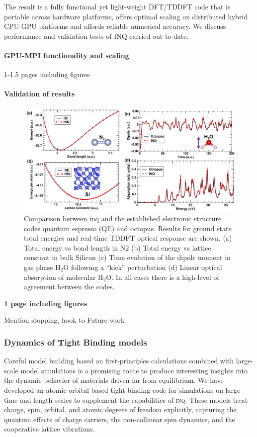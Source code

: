 The result is a fully functional yet light-weight DFT/TDDFT code that is portable across hardware platforms, offers optimal scaling on distributed hybrid CPU-GPU platforms and affords reliable numerical accuracy. We discuss performance and validation tests of \textsc{INQ} carried out to date.   
\paragraph{GPU-MPI functionality and scaling}
1-1.5 pages including figures
\paragraph{Validation of results}
\begin{figure}[h]
    \centering
    \includegraphics[width=1.0\linewidth]{figures/Results-Fig.pdf}
    \caption{
         Comparison between inq and the established electronic structure codes quantum espresso (QE) and octopus.
Results for ground state total energies and real-time TDDFT optical response are shown. (a) Total energy vs bond length in
N2 (b) Total energy vs lattice constant in bulk Silicon (c) Time evolution of the dipole moment in gas phase H$_2$O following a
“kick” perturbation (d) Linear optical absorption of molecular H$_2$O. In all cases there is a high-level of agreement between the
codes.  
    }
    \label{fig:inq_design}
\end{figure}

\textbf{1 page including figures}

Mention stopping, hook to Future work

\subsubsection{Dynamics of Tight Binding models}\label{sec:tight-binding}

Careful model building based on first-principles calculations combined with large-scale model simulations is a promising route to produce interesting insights into the dynamic behavior of  
materials driven far from equilibrium. We have developed an atomic-orbital-based
tight-binding code for simulations on large time and
length scales to supplement the capabilities of \textsc{inq}. These models treat
charge, spin, orbital, and atomic degrees of freedom explicitly, capturing the quantum effects of 
charge carriers, the non-collinear spin dynamics, and the
cooperative lattice vibrations. 

